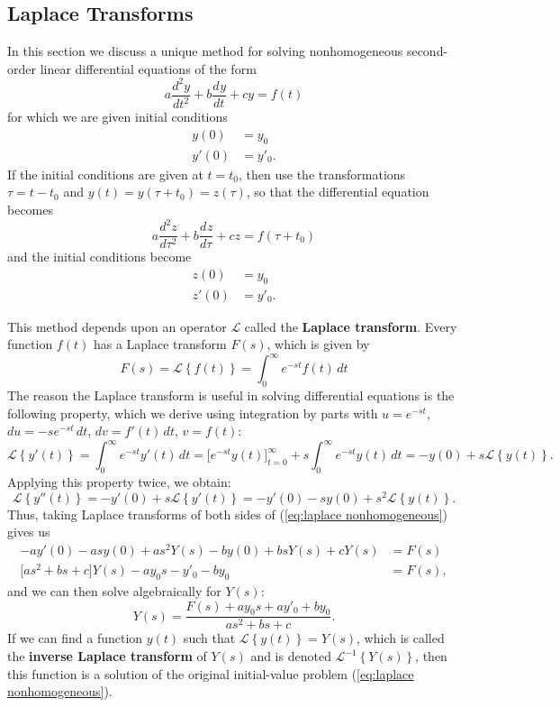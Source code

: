 \documentclass{myart}
\newcommand{\term}[1]{\textbf{#1}}
\newcommand{\eq}[1]{(\ref{eq:#1})}
\newcommand{\deriv}[3][]{\frac{d^{#1}#2}{d#3^{#1}}}
\renewcommand{\L}[1]{\mathcal{L}\left\{#1\right\}}
\newcommand{\Li}[1]{\mathcal{L}^{-1}\left\{#1\right\}}
\begin{document}
\subsection{Laplace Transforms}
\label{subsec:laplace}

In this section we discuss a unique method for solving nonhomogeneous
second-order linear differential equations of the form
\begin{equation} \label{eq:laplace nonhomogeneous}
  a \deriv[2]{y}{t} + b \deriv{y}{t} + c y = f(t)
\end{equation}
for which we are given initial conditions
\begin{align*}
  y(0) &= y_0 \\
  y'(0) &= y'_0.
\end{align*}
If the initial conditions are given at $t = t_0$, then use the
transformations $\tau = t - t_0$ and $y(t) = y(\tau + t_0) = z(\tau)$,
so that the differential equation becomes
\begin{equation*}
  a \deriv[2]{z}{\tau} + b \deriv{z}{\tau} + c z = f(\tau + t_0)
\end{equation*}
and the initial conditions become
\begin{align*}
  z(0) &= y_0 \\
  z'(0) &= y'_0.
\end{align*}

This method depends upon an operator $\mathcal{L}$ called the
\term{Laplace transform}. Every function $f(t)$ has a Laplace
transform $F(s)$, which is given by
\begin{equation*}
  F(s) = \L{f(t)} = \int_0^\infty e^{-st} f(t) \,dt
\end{equation*}
The reason the Laplace transform is useful in solving differential
equations is the following property, which we derive using integration
by parts with $u = e^{-st}$, $du = -s e^{-st} \,dt$, $dv = f'(t)
\,dt$, $v = f(t)$:
\begin{equation*}
    \L{y'(t)}
  = \int_0^\infty e^{-st} y'(t) \,dt
  = \bigg[e^{-st} y(t)\bigg]_{t=0}^\infty
  + s \int_0^\infty e^{-st} y(t) \,dt
  = -y(0) + s \L{y(t)}.
\end{equation*}
Applying this property twice, we obtain:
\begin{equation*}
  \L{y''(t)} = -y'(0) + s \L{y'(t)} = -y'(0) - s y(0) + s^2 \L{y(t)}.
\end{equation*}
Thus, taking Laplace transforms of both sides of \eq{laplace
  nonhomogeneous} gives us
\begin{align*}
     -a y'(0) - as y(0) + as^2 Y(s) - b y(0) + bs Y(s) + c Y(s)
  &= F(s) \\
     \big[as^2 + bs + c\big] Y(s) - a y_0 s - y'_0 - b y_0
  &= F(s),
\end{align*}
and we can then solve algebraically for $Y(s)$:
\begin{equation*}
  Y(s) = \frac{F(s) + ay_0s + ay'_0 + by_0}{as^2 + bs + c}.
\end{equation*}
If we can find a function $y(t)$ such that $\L{y(t)} = Y(s)$, which is
called the \term{inverse Laplace transform} of $Y(s)$ and is denoted
$\Li{Y(s)}$, then this function is a solution of the original
initial-value problem \eq{laplace nonhomogeneous}.
\end{document}
